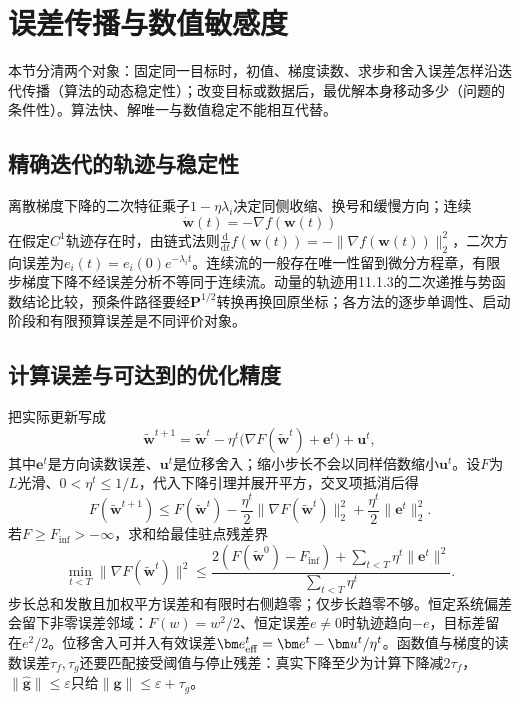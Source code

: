 \section{误差传播与数值敏感度}
\label{sec:opt-numerics-sensitivity}

本节分清两个对象：固定同一目标时，初值、梯度读数、求步和舍入误差怎样沿迭代传播（算法的动态稳定性）；改变目标或数据后，最优解本身移动多少（问题的条件性）。算法快、解唯一与数值稳定不能相互代替。

\subsection{精确迭代的轨迹与稳定性}

离散梯度下降的二次特征乘子$1-\eta\lambda_i$决定同侧收缩、换号和缓慢方向；连续
\[
 \dot{\bm w}(t)=-\nabla f(\bm w(t))
\]
在假定$C^1$轨迹存在时，由链式法则$\frac{\mathrm d}{\mathrm dt}f(\bm w(t))=-\|\nabla f(\bm w(t))\|_2^2$，二次方向误差为$e_i(t)=e_i(0)e^{-\lambda_i t}$。连续流的一般存在唯一性留到微分方程章，有限步梯度下降不经误差分析不等同于连续流。动量的轨迹用11.1.3的二次递推与势函数结论比较，预条件路径要经$\bm P^{1/2}$转换再换回原坐标；各方法的逐步单调性、启动阶段和有限预算误差是不同评价对象。

\subsection{计算误差与可达到的优化精度}

把实际更新写成
\[
 \widetilde{\bm w}^{t+1}=\widetilde{\bm w}^t
 -\eta^t\bigl(\nabla F(\widetilde{\bm w}^t)+\bm e^t\bigr)+\bm u^t,
\]
其中$\bm e^t$是方向读数误差、$\bm u^t$是位移舍入；缩小步长不会以同样倍数缩小$\bm u^t$。设$F$为$L$光滑、$0<\eta^t\leq1/L$，代入下降引理并展开平方，交叉项抵消后得
\begin{equation}
 F(\widetilde{\bm w}^{t+1})
 \leq F(\widetilde{\bm w}^t)
 -\frac{\eta^t}{2}\|\nabla F(\widetilde{\bm w}^t)\|_2^2
 +\frac{\eta^t}{2}\|\bm e^t\|_2^2.
 \label{eq:opt-inexact-gradient-descent}
\end{equation}
若$F\geq F_{\inf}>-\infty$，求和给最佳驻点残差界
\begin{equation}
 \min_{t<T}\|\nabla F(\widetilde{\bm w}^t)\|^2
 \leq
 \frac{2(F(\widetilde{\bm w}^0)-F_{\inf})
 +\sum_{t<T}\eta^t\|\bm e^t\|^2}
 {\sum_{t<T}\eta^t}.
 \label{eq:opt-inexact-gradient-finite-rate}
\end{equation}
步长总和发散且加权平方误差和有限时右侧趋零；仅步长趋零不够。恒定系统偏差会留下非零误差邻域：$F(w)=w^2/2$、恒定误差$e\neq0$时轨迹趋向$-e$，目标差留在$e^2/2$。位移舍入可并入有效误差$\bm e_{\rm eff}^t=\bm e^t-\bm u^t/\eta^t$。函数值与梯度的读数误差$\tau_f,\tau_g$还要匹配接受阈值与停止残差：真实下降至少为计算下降减$2\tau_f$，$\|\widehat{\bm g}\|\leq\varepsilon$只给$\|\bm g\|\leq\varepsilon+\tau_g$。

